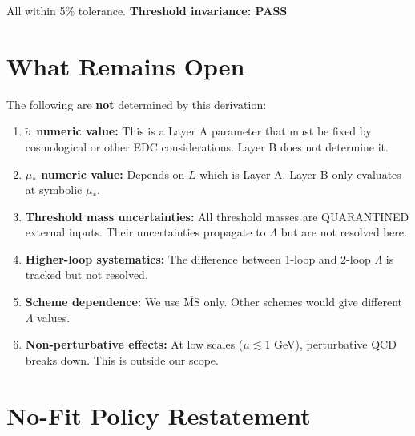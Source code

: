 \documentclass[11pt,a4paper]{article}
\theoremstyle{definition}
\begin{document}
All within 5\% tolerance. \textbf{Threshold invariance: PASS}

\section{What Remains Open}
\label{sec:open}

\begin{trapbox}
The following are \textbf{not} determined by this derivation:

\begin{enumerate}
  \item \textbf{$\tilde{\sigma}$ numeric value:} This is a Layer A parameter
        that must be fixed by cosmological or other EDC considerations.
        Layer B does not determine it.

  \item \textbf{$\mu_*$ numeric value:} Depends on $L$ which is Layer A.
        Layer B only evaluates at symbolic $\mu_*$.

  \item \textbf{Threshold mass uncertainties:} All threshold masses are
        QUARANTINED external inputs. Their uncertainties propagate to
        $\Lambda$ but are not resolved here.

  \item \textbf{Higher-loop systematics:} The difference between 1-loop
        and 2-loop $\Lambda$ is tracked but not resolved.

  \item \textbf{Scheme dependence:} We use $\overline{\text{MS}}$ only.
        Other schemes would give different $\Lambda$ values.

  \item \textbf{Non-perturbative effects:} At low scales ($\mu \lesssim 1$ GeV),
        perturbative QCD breaks down. This is outside our scope.
\end{enumerate}
\end{trapbox}

\section{No-Fit Policy Restatement}
\label{sec:no-fit}
\end{document}
